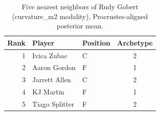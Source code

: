 \begin{table}[htbp]
  \centering\small
  \begin{tabular}{rllc}
    \toprule
    Rank & Player & Position & Archetype \\
    \midrule
    1 & Ivica Zubac & C & 2 \\
    2 & Aaron Gordon & F & 1 \\
    3 & Jarrett Allen & C & 2 \\
    4 & KJ Martin & F & 1 \\
    5 & Tiago Splitter & F & 2 \\
    \bottomrule
  \end{tabular}
  \caption{Five nearest neighbors of Rudy Gobert (curvature_m2 modality), Procrustes-aligned posterior mean.}
  \label{tab:Rudy_Gobert_neighbors_curvature_m2}
\end{table}

